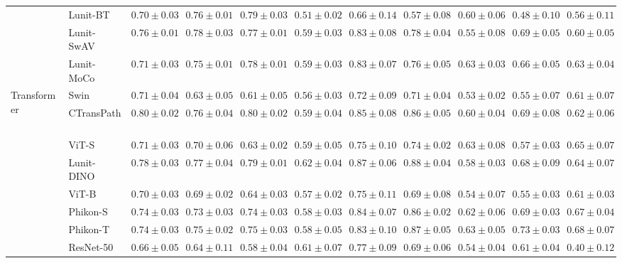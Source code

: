 \begin{tabular}{ll|cccc|c|cccc}
 & Lunit-BT~\cite{kang2023benchmarking} & $0.70 \pm 0.03$ & $0.76 \pm 0.01$ & $\mathbf{0.79 \pm 0.03}$ & $0.51 \pm 0.02$ & $0.66 \pm 0.14$ & $0.57 \pm 0.08$ & $0.60 \pm 0.06$ & $0.48 \pm 0.10$ & $0.56 \pm 0.11$ \\
 & Lunit-SwAV~\cite{kang2023benchmarking} & $0.76 \pm 0.01$ & $0.78 \pm 0.03$ & $0.77 \pm 0.01$ & $0.59 \pm 0.03$ & $0.83 \pm 0.08$ & $0.78 \pm 0.04$ & $0.55 \pm 0.08$ & $0.69 \pm 0.05$ & $0.60 \pm 0.05$ \\
 & Lunit-MoCo~\cite{kang2023benchmarking} & $0.71 \pm 0.03$ & $0.75 \pm 0.01$ & $0.78 \pm 0.01$ & $0.59 \pm 0.03$ & $0.83 \pm 0.07$ & $0.76 \pm 0.05$ & $0.63 \pm 0.03$ & $0.66 \pm 0.05$ & $0.63 \pm 0.04$ \\
\cline{1-11}
\multirow[t]{12}{*}{Transformer} & Swin~\cite{liu2021swin} & $0.71 \pm 0.04$ & $0.63 \pm 0.05$ & $0.61 \pm 0.05$ & $0.56 \pm 0.03$ & $0.72 \pm 0.09$ & $0.71 \pm 0.04$ & $0.53 \pm 0.02$ & $0.55 \pm 0.07$ & $0.61 \pm 0.07$ \\
 & CTransPath~\cite{wang2022transformer} & $\mathbf{0.80 \pm 0.02}$ & $0.76 \pm 0.04$ & $\mathbf{0.80 \pm 0.02}$ & $0.59 \pm 0.04$ & $0.85 \pm 0.08$ & $0.86 \pm 0.05$ & $0.60 \pm 0.04$ & $0.69 \pm 0.08$ & $0.62 \pm 0.06$ \\
 & ViT-S~\cite{kolesnikov2021image} & $0.71 \pm 0.03$ & $0.70 \pm 0.06$ & $0.63 \pm 0.02$ & $0.59 \pm 0.05$ & $0.75 \pm 0.10$ & $0.74 \pm 0.02$ & $0.63 \pm 0.08$ & $0.57 \pm 0.03$ & $0.65 \pm 0.07$ \\
 & Lunit-DINO~\cite{kang2023benchmarking} & $0.78 \pm 0.03$ & $0.77 \pm 0.04$ & $0.79 \pm 0.01$ & $0.62 \pm 0.04$ & $\mathbf{0.87 \pm 0.06}$ & $\mathbf{0.88 \pm 0.04}$ & $0.58 \pm 0.03$ & $0.68 \pm 0.09$ & $0.64 \pm 0.07$ \\
 & ViT-B~\cite{kolesnikov2021image} & $0.70 \pm 0.03$ & $0.69 \pm 0.02$ & $0.64 \pm 0.03$ & $0.57 \pm 0.02$ & $0.75 \pm 0.11$ & $0.69 \pm 0.08$ & $0.54 \pm 0.07$ & $0.55 \pm 0.03$ & $0.61 \pm 0.03$ \\
 & Phikon-S~\cite{filiot2023scaling} & $0.74 \pm 0.03$ & $0.73 \pm 0.03$ & $0.74 \pm 0.03$ & $0.58 \pm 0.03$ & $0.84 \pm 0.07$ & $0.86 \pm 0.02$ & $0.62 \pm 0.06$ & $0.69 \pm 0.03$ & $0.67 \pm 0.04$ \\
 & Phikon-T~\cite{filiot2023scaling} & $0.74 \pm 0.03$ & $0.75 \pm 0.02$ & $0.75 \pm 0.03$ & $0.58 \pm 0.05$ & $0.83 \pm 0.10$ & $0.87 \pm 0.05$ & $\mathbf{0.63 \pm 0.05}$ & $\mathbf{0.73 \pm 0.03}$ & $\mathbf{0.68 \pm 0.07}$ \\
 & ResNet-50~\cite{he2015deep} & $0.66 \pm 0.05$ & $0.64 \pm 0.11$ & $0.58 \pm 0.04$ & $0.61 \pm 0.07$ & $0.77 \pm 0.09$ & $0.69 \pm 0.06$ & $0.54 \pm 0.04$ & $0.61 \pm 0.04$ & $0.40 \pm 0.12$ \\

\end{tabular}
